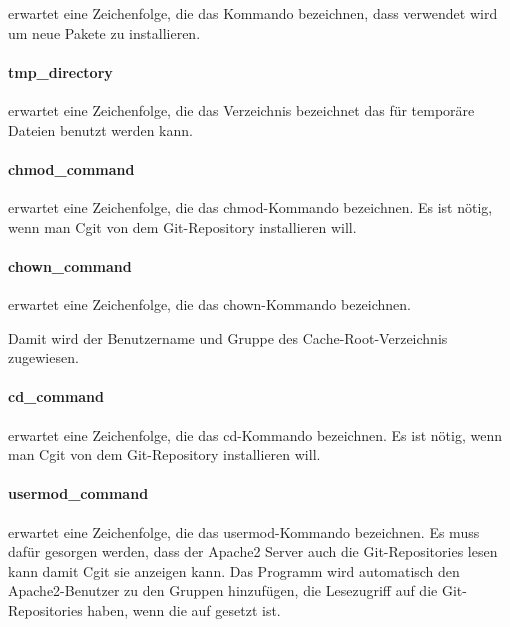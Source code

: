  erwartet eine Zeichenfolge, die das Kommando
bezeichnen, dass verwendet wird um neue Pakete zu installieren.

\paragraph{tmp\_directory}

 erwartet eine Zeichenfolge, die das Verzeichnis bezeichnet
das für temporäre Dateien benutzt werden kann.

\paragraph{chmod\_command}

 erwartet eine Zeichenfolge, die das
chmod-Kommando bezeichnen. Es ist nötig, wenn man Cgit von dem Git-Repository installieren will.

\paragraph{chown\_command}

 erwartet eine Zeichenfolge, die das
chown-Kommando bezeichnen.

Damit wird der Benutzername und Gruppe des Cache-Root-Verzeichnis zugewiesen.

\paragraph{cd\_command}

 erwartet eine Zeichenfolge, die das
cd-Kommando bezeichnen. Es ist nötig, wenn man Cgit von dem Git-Repository installieren will.

\paragraph{usermod\_command}

 erwartet eine Zeichenfolge, die das
usermod-Kommando bezeichnen. Es muss dafür gesorgen werden, dass der Apache2
Server auch die Git-Repositories lesen kann damit Cgit sie anzeigen kann. Das
Programm wird automatisch den Apache2-Benutzer zu den Gruppen hinzufügen, die
Lesezugriff auf die Git-Repositories haben, wenn die
 auf  gesetzt ist.

